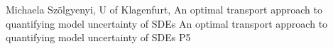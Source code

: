 {}	%
{}		%
{Michaela Szölgyenyi, U of Klagenfurt, An optimal transport approach to quantifying model uncertainty of SDEs}	%
{An optimal transport approach to quantifying model uncertainty of SDEs}		%
{P5}		%
\\\hline
